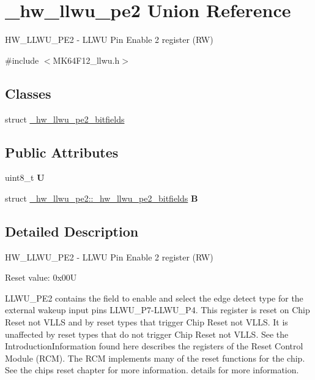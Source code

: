 \hypertarget{union__hw__llwu__pe2}{}\section{\+\_\+hw\+\_\+llwu\+\_\+pe2 Union Reference}
\label{union__hw__llwu__pe2}


H\+W\+\_\+\+L\+L\+W\+U\+\_\+\+P\+E2 -\/ L\+L\+WU Pin Enable 2 register (RW)  




{\ttfamily \#include $<$M\+K64\+F12\+\_\+llwu.\+h$>$}

\subsection*{Classes}
\begin{DoxyCompactItemize}
\item 
struct \hyperlink{struct__hw__llwu__pe2_1_1__hw__llwu__pe2__bitfields}{\+\_\+hw\+\_\+llwu\+\_\+pe2\+\_\+bitfields}
\end{DoxyCompactItemize}
\subsection*{Public Attributes}
\begin{DoxyCompactItemize}
\item 
uint8\+\_\+t {\bfseries U}\hypertarget{union__hw__llwu__pe2_a4d6334dda22d4e86ad009ad18d8ace22}{}\label{union__hw__llwu__pe2_a4d6334dda22d4e86ad009ad18d8ace22}

\item 
struct \hyperlink{struct__hw__llwu__pe2_1_1__hw__llwu__pe2__bitfields}{\+\_\+hw\+\_\+llwu\+\_\+pe2\+::\+\_\+hw\+\_\+llwu\+\_\+pe2\+\_\+bitfields} {\bfseries B}\hypertarget{union__hw__llwu__pe2_ae46429312fe0c015876c377b7f70b17f}{}\label{union__hw__llwu__pe2_ae46429312fe0c015876c377b7f70b17f}

\end{DoxyCompactItemize}


\subsection{Detailed Description}
H\+W\+\_\+\+L\+L\+W\+U\+\_\+\+P\+E2 -\/ L\+L\+WU Pin Enable 2 register (RW) 

Reset value\+: 0x00U

L\+L\+W\+U\+\_\+\+P\+E2 contains the field to enable and select the edge detect type for the external wakeup input pins L\+L\+W\+U\+\_\+\+P7-\/\+L\+L\+W\+U\+\_\+\+P4. This register is reset on Chip Reset not V\+L\+LS and by reset types that trigger Chip Reset not V\+L\+LS. It is unaffected by reset types that do not trigger Chip Reset not V\+L\+LS. See the Introduction\+Information found here describes the registers of the Reset Control Module (R\+CM). The R\+CM implements many of the reset functions for the chip. See the chip\textquotesingle{}s reset chapter for more information. details for more information. 

